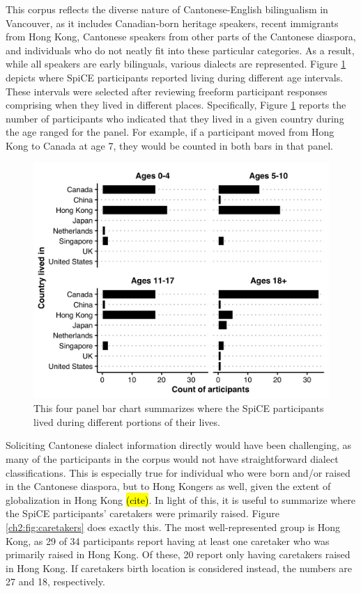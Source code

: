 This corpus reflects the diverse nature of Cantonese-English bilingualism in Vancouver, as it includes Canadian-born heritage speakers, recent immigrants from Hong Kong, Cantonese speakers from other parts of the Cantonese diaspora, and individuals who do not neatly fit into these particular categories. As a result, while all speakers are early bilinguals, various dialects are represented. Figure \ref{ch2:fig:placeslived} depicts where SpiCE participants reported living during different age intervals. These intervals were selected after reviewing freeform participant responses comprising when they lived in different places. Specifically, Figure \ref{ch2:fig:placeslived} reports the number of participants who indicated that they lived in a given country during the age ranged for the panel. For example, if a participant moved from Hong Kong to Canada at age 7, they would be counted in both bars in that panel. 

\begin{figure}[!htbp]
  \begin{center}
  \includegraphics[width=4.9in]{figures/ch2_placeslived_5in.png} 
  \caption{This four panel bar chart summarizes where the SpiCE participants lived during different portions of their lives.}
  \label{ch2:fig:placeslived}
  \end{center}
\end{figure}

Soliciting Cantonese dialect information directly would have been challenging, as many of the participants in the corpus would not have straightforward dialect classifications. This is especially true for individual who were born and/or raised in the Cantonese diaspora, but to Hong Kongers as well, given the extent of globalization in Hong Kong \hl{(cite)}. In light of this, it is useful to summarize where the SpiCE participants' caretakers were primarily raised. Figure \ref{ch2:fig:caretakers} does exactly this. The most well-represented group is Hong Kong, as 29 of 34 participants report having at least one caretaker who was primarily raised in Hong Kong. Of these, 20 report only having caretakers raised in Hong Kong. If caretakers birth location is considered instead, the numbers are 27 and 18, respectively. 

